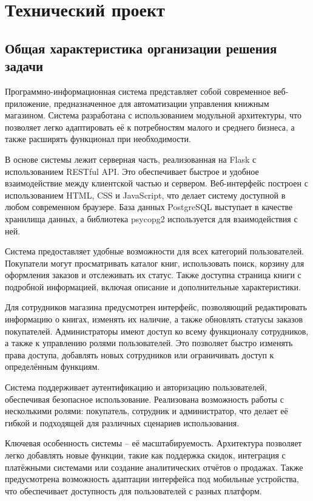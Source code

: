 \section{Технический проект}
\subsection{Общая характеристика организации решения задачи}

Программно-информационная система представляет собой современное веб-приложение, предназначенное для автоматизации управления книжным магазином. Система разработана с использованием модульной архитектуры, что позволяет легко адаптировать её к потребностям малого и среднего бизнеса, а также расширять функционал при необходимости.

В основе системы лежит серверная часть, реализованная на Flask с использованием RESTful API. Это обеспечивает быстрое и удобное взаимодействие между клиентской частью и сервером. Веб-интерфейс построен с использованием HTML, CSS и JavaScript, что делает систему доступной в любом современном браузере. База данных PostgreSQL выступает в качестве хранилища данных, а библиотека psycopg2 используется для взаимодействия с ней.

Система предоставляет удобные возможности для всех категорий пользователей. Покупатели могут просматривать каталог книг, использовать поиск, корзину для оформления заказов и отслеживать их статус. Также доступна страница книги с подробной информацией, включая описание и дополнительные характеристики.

Для сотрудников магазина предусмотрен интерфейс, позволяющий редактировать информацию о книгах, изменять их наличие, а также обновлять статусы заказов покупателей. Администраторы имеют доступ ко всему функционалу сотрудников, а также к управлению ролями пользователей. Это позволяет быстро изменять права доступа, добавлять новых сотрудников или ограничивать доступ к определённым функциям.

Система поддерживает аутентификацию и авторизацию пользователей, обеспечивая безопасное использование. Реализована возможность работы с несколькими ролями: покупатель, сотрудник и администратор, что делает её гибкой и подходящей для различных сценариев использования.

Ключевая особенность системы – её масштабируемость. Архитектура позволяет легко добавлять новые функции, такие как поддержка скидок, интеграция с платёжными системами или создание аналитических отчётов о продажах. Также предусмотрена возможность адаптации интерфейса под мобильные устройства, что обеспечивает доступность для пользователей с разных платформ.


